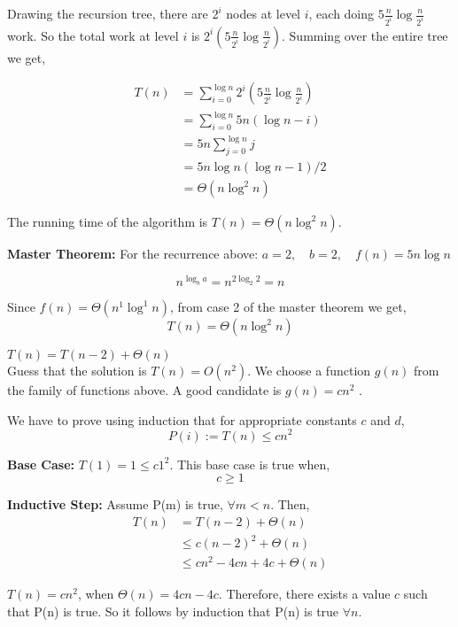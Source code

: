 \documentclass[12pt,twoside]{article}
\begin{document}
\begin{problems}
\begin{problemparts}
Drawing the recursion tree, there are $2^i$ nodes at level $i$, each doing $5 \frac{n}{2^i}\log \frac{n}{2^i}$ work. So the total work at level $i$ is $2^i (5 \frac{n}{2^i}\log \frac{n}{2^i})$. Summing over the entire tree we get, 

\[
	\begin{split}
		T(n) &= \sum_{i=0}^{\log n} 2^i (5 \frac{n}{2^i}\log \frac{n}{2^i}) \\
		&= \sum_{i=0}^{\log n} 5n (\log n - i)\\
		&= 5n \sum_{j=0}^{\log n} j\\
		&= 5n \log n (\log n - 1)/2 \\
		&= \Theta(n\log^2 n)
	\end{split}
\]

The running time of the algorithm is $T(n) = \Theta(n\log^2 n)$.

\textbf{Master Theorem:} For the recurrence above: \(a=2, \quad b=2, \quad f(n) = 5n\log n\) 

\[n^{\log_b a} = n^{2 \log_2 2} = n\]

Since \( f(n) = \Theta(n^1 \log^1 n)\), from case 2 of the master theorem we get,
\[ T(n) = \Theta(n \log^2 n) \]


\problempart %
\( T(n) = T(n-2) + \Theta(n)\) \\

	Guess that the solution is \( T(n) = O(n^2) \). We choose a function $g(n)$ from the family of functions above. A good candidate is \boldmath \(g(n) = cn^2\) \unboldmath. 
	
	We have to prove using induction that for appropriate constants $c$ and $d$, 
	\[ P(i):= T(n) \leq cn^2\] 
	
	\textbf{Base Case:} \( T(1) = 1 \leq c1^2\). This base case is true when,
	\begin{equation}
	\label{eq:1}
		c\geq 1
	\end{equation}

\textbf{Inductive Step:} Assume P(m) is true, \( \forall m < n \). Then,
\begin{equation}
	\begin{split}
		T(n)  &=  T(n-2) + \Theta(n) \\
			&\leq c(n-2)^2 + \Theta(n) \\
			&\leq cn^2-4cn+4c + \Theta(n)
	\end{split}
\end{equation}

$T(n) = cn^2$, when $\Theta(n) = 4cn - 4c$. Therefore, there exists a value $c$ such that P(n) is true. So it follows by induction that P(n) is true $\forall n$.


\end{problemparts}
\end{problems}
\end{document}

